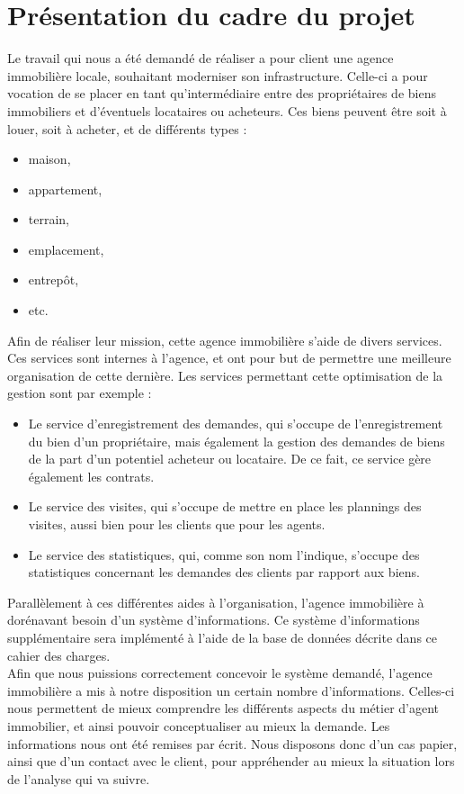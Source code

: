 \section{Présentation du cadre du projet}
Le travail qui nous a été demandé de réaliser a pour client une agence immobilière locale, souhaitant moderniser son infrastructure. Celle-ci a pour vocation de se placer en tant qu'intermédiaire entre des propriétaires de biens immobiliers et d'éventuels locataires ou acheteurs. Ces biens peuvent être soit à louer, soit à acheter, et de différents types : 
\begin{itemize}
	\item maison,
	\item appartement,
	\item terrain,
	\item emplacement,
	\item entrepôt,
	\item etc.\\
\end{itemize}

Afin de réaliser leur mission, cette agence immobilière s'aide de divers services. Ces services sont internes à l'agence, et ont pour but de permettre une meilleure organisation de cette dernière. Les services permettant cette optimisation de la gestion sont par exemple :
\begin{itemize}
\item Le service d'enregistrement des demandes, qui s'occupe de l'enregistrement du bien d'un propriétaire, mais également la gestion des demandes de biens de la part d'un potentiel acheteur ou locataire. De ce fait, ce service gère également les contrats.
\item Le service des visites, qui s'occupe de mettre en place les plannings des visites, aussi bien pour les clients que pour les agents.
\item Le service des statistiques, qui, comme son nom l'indique, s'occupe des statistiques concernant les demandes des clients par rapport aux biens. \\
\end{itemize}

Parallèlement à ces différentes aides à l'organisation, l'agence immobilière à dorénavant besoin d'un système d'informations. Ce système d'informations supplémentaire sera implémenté à l'aide de la base de données décrite dans ce cahier des charges.\\

Afin que nous puissions correctement concevoir le système demandé, l'agence immobilière a mis à notre disposition un certain nombre d'informations. Celles-ci nous permettent de mieux comprendre les différents aspects du métier d'agent immobilier, et ainsi pouvoir conceptualiser au mieux la demande. Les informations nous ont été remises par écrit. Nous disposons donc d'un cas papier, ainsi que d'un contact avec le client, pour appréhender au mieux la situation lors de l'analyse qui va suivre.